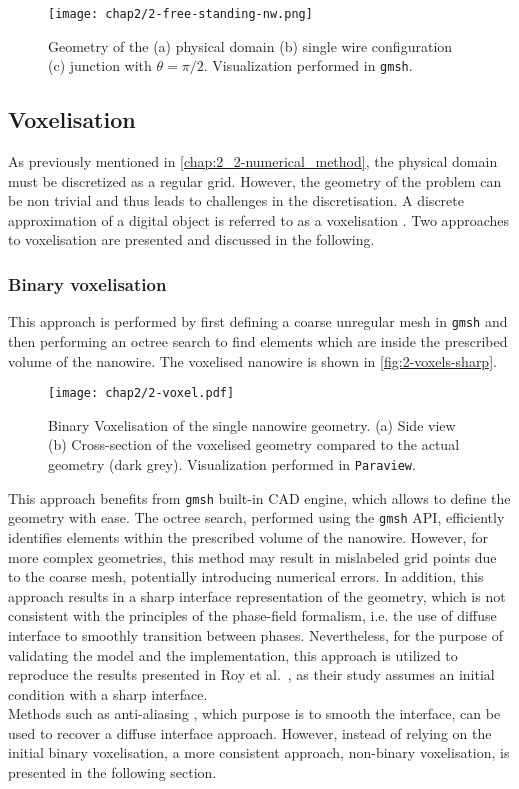     \begin{figure}[H]
        \centering
        \texttt{[image: chap2/2-free-standing-nw.png]}
        \caption{Geometry of the (a) physical domain (b) single wire configuration (c) junction with $\theta = \pi/2$. Visualization performed in \texttt{gmsh}.}
        \label{fig:2-free-standing-nw}
    \end{figure}
\subsection{Voxelisation}
    As previously mentioned in \autoref{chap:2_2-numerical_method}, the physical domain must be discretized as a regular grid. However, the geometry of the problem can be non trivial and thus leads to challenges in the discretisation. A discrete approximation of a digital object is referred to as a voxelisation \cite{Aleksandrov2021}. Two approaches to voxelisation are presented and discussed in the following.
    \subsubsection{Binary voxelisation}
    This approach is performed by first defining a coarse unregular mesh in \texttt{gmsh} and then performing an octree search to find elements which are inside the prescribed volume of the nanowire. The voxelised nanowire is shown in \autoref{fig:2-voxels-sharp}.
    \begin{figure}[H]
        \centering
        \texttt{[image: chap2/2-voxel.pdf]}
        \caption{Binary Voxelisation of the single nanowire geometry. (a) Side view (b) Cross-section of the voxelised geometry compared to the actual geometry (dark grey). Visualization performed in \texttt{Paraview}.}
        \label{fig:2-voxels-sharp}
    \end{figure}
    This approach benefits from \texttt{gmsh} built-in CAD engine, which allows to define the geometry with ease. The octree search, performed using the \texttt{gmsh} API, efficiently identifies elements within the prescribed volume of the nanowire. However, for more complex geometries, this method may result in mislabeled grid points due to the coarse mesh, potentially introducing numerical errors. In addition, this approach results in a sharp interface representation of the geometry, which is not consistent with the principles of the phase-field formalism, i.e. the use of diffuse interface to smoothly transition between phases. Nevertheless, for the purpose of validating the model and the implementation, this approach is utilized to reproduce the results presented in Roy et al.~\cite{RoyVarmaGururajan2021}, as their study assumes an initial condition with a sharp interface.\\
    Methods such as anti-aliasing \cite{Aleksandrov2021}, which purpose is to smooth the interface, can be used to recover a diffuse interface approach. However, instead of relying on the initial binary voxelisation, a more consistent approach, non-binary voxelisation, is presented in the following section.
